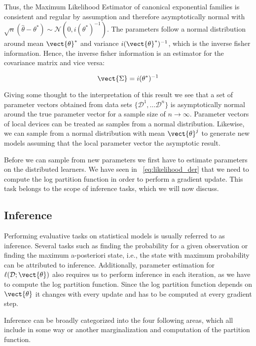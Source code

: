         Thus, the Maximum Likelihood Estimator of canonical exponential families is consistent and  regular by assumption and therefore asymptotically normal with $\sqrt{n}(\hat{\theta} - \theta^*) \sim \mathcal{N}(0, i(\theta^*)^{-1})$.
        The parameters follow a normal distribution around mean $\vect{\theta}^*$ and variance $i(\vect{\theta}^*)^{-1}$, which is the inverse fisher information.
        Hence, the inverse fisher information is an estimator for the covariance matrix and vice versa:
        
        \begin{equation}
            \vect{\Sigma} =  i(\theta^*)^{-1}
        \end{equation}

        Giving some thought to the interpretation of this result we see that a set of parameter vectors obtained from data sets $\{\mathcal{D}^1, \ldots \mathcal{D}^n\}$ is asymptotically normal around the true parameter vector for a sample size of $n \rightarrow \infty$.
        Parameter vectors of local devices can be treated as samples from a normal distribution.
        Likewise, we can sample from a normal distribution with mean $\vect{\theta}^j$ to generate new models assuming that the local parameter vector the asymptotic result.
        
        Before we can sample from new parameters we first have to estimate parameters on the distributed learners. 
        We have seen in \eq~\ref{eq:likelihood_der} that we need to compute the log partition function in order to perform a gradient update.
        This task belongs to  the scope of inference tasks, which we will now discuss.

\subsection{Inference}
\label{ssec:inf}
Performing evaluative tasks on statistical models is usually referred to as inference.
Several tasks such as finding the probability for a given observation or finding the maximum a-posteriori state, i.e., the state with maximum probability can be attributed to inference.
Additionally, parameter estimation for $\ell(\mathcal{D}; \vect{\theta})$ also requires us to perform inference in each iteration, as we have to compute the log partition function.
Since the log partition function depends on $\vect{\theta}$ it changes with every update and has to be computed at every gradient step.

Inference can be broadly categorized into the four following areas, which all include in some way or another marginalization and computation of the partition function.

